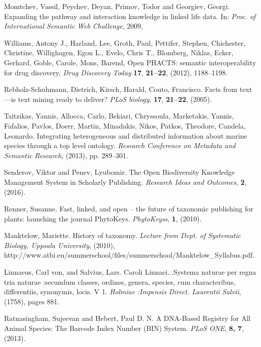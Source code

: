 \documentclass{IOS-Book-Article}
\begin{document}
\begin{thebibliography}{99}

Momtchev, Vassil, Peychev, Deyan, Primov, Todor and Georgiev, Georgi. Expanding the pathway and interaction knowledge in linked life data. In: \textit{Proc. of International Semantic Web Challenge}, 2009, 

Williams, Antony J., Harland, Lee, Groth, Paul, Pettifer, Stephen, Chichester, Christine, Willighagen, Egon L., Evelo, Chris T., Blomberg, Niklas, Ecker, Gerhard, Goble, Carole, Mons, Barend, Open {PHACTS}: semantic interoperability for drug discovery, 
\textit{Drug Discovery Today} \textbf{17}, \textbf{21--22}, (2012), 1188--1198.

Rebholz-Schuhmann, Dietrich, Kirsch, Harald, Couto, Francisco. Facts from text—is text mining ready to deliver? \textit{PLoS biology}, \textbf{17}, \textbf{21--22}, (2005).

Tzitzikas, Yannis, Allocca, Carlo, Bekiari, Chryssoula, Marketakis, Yannis, Fafalios, Pavlos, Doerr, Martin, Minadakis, Nikos, Patkos, Theodore, Candela, Leonardo. Integrating heterogeneous and distributed information about marine species through a top level ontology. \textit{Research {Conference} on {Metadata} and {Semantic} {Research}}, (2013), pp. 289--301.

Senderov, Viktor and Penev, Lyubomir. The {Open} {Biodiversity} {Knowledge} {Management} {System} in {Scholarly} {Publishing}. \textit{Research Ideas and Outcomes}, \textbf{2}, (2016).

Renner, Susanne. Fast, linked, and open – the future of taxonomic publishing for plants: launching the journal {PhytoKeys}. \textit{PhytoKeyss}, \textbf{1}, (2010).

Manktelow, Mariette. History of taxonomy. \textit{Lecture from Dept. of Systematic Biology, Uppsala University}, (2010), http://www.atbi.eu/summerschool/files/summerschool/Manktelow\_Syllabus.pdf.

Linnaeus, Carl von, and Salvius, Lars. Caroli Linnaei...Systema naturae per regna tria naturae :secundum classes, ordines, genera, species, cum characteribus, differentiis, synonymis, locis. V 1. \textit{Holmiae :Impensis Direct. Laurentii Salvii}, (1758), pages 881.

Ratnasingham, Sujeevan and Hebert, Paul D. N. A {DNA}-{Based} {Registry} for {All} {Animal} {Species}: {The} {Barcode} {Index} {Number} ({BIN}) {System}. \textit{PLoS ONE}, \textbf{8, 7}, (2013).


\end{thebibliography}
\end{document}
